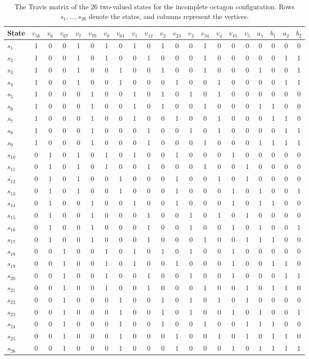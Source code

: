 \documentclass[
  twocolumn,
  aps,
  pra,
  floatfix,
  amsmath,amssymb,
  longbibliography
]{revtex4-2}
\theoremstyle{definition}
\theoremstyle{remark}
\begin{document}
\begin{table}[htb]
\centering
\caption{The Travis matrix of the 26 two-valued states for the incomplete octagon configuration. Rows $s_1, \dots, s_{26}$ denote the states, and columns represent the vertices.}
\label{tab:matrix26}
\footnotesize
\setlength{\tabcolsep}{4.5pt}
\begin{tabular}{l|cccccccccccccccccccc}
\toprule
State & $v_{56}$ & $v_{6}$ & $v_{67}$ & $v_{7}$ & $v_{70}$ & $v_{0}$ & $v_{01}$ & $v_{1}$ & $v_{12}$ & $v_{2}$ & $v_{23}$ & $v_{3}$ & $v_{34}$ & $v_{4}$ & $v_{45}$ & $v_{5}$ & $a_{1}$ & $b_{1}$ & $a_{2}$ & $b_{2}$ \\
\midrule
$s_{1}$  & 1&0&0&1&0&1&0&1&0&1&0&0&1&0&0&0&0&0&0&0 \\
$s_{2}$  & 1&0&0&1&0&1&0&0&1&0&0&0&1&0&0&0&0&0&1&1 \\
$s_{3}$  & 1&0&0&1&0&0&1&0&0&1&0&0&1&0&0&0&1&0&0&1 \\
$s_{4}$  & 1&0&0&1&0&0&1&0&0&0&1&0&0&1&0&0&0&0&1&1 \\
$s_{5}$  & 1&0&0&0&1&0&0&1&0&1&0&1&0&1&0&0&0&0&0&0 \\
$s_{6}$  & 1&0&0&0&1&0&0&1&0&1&0&0&1&0&0&0&1&1&0&0 \\
$s_{7}$  & 1&0&0&0&1&0&0&1&0&0&1&0&0&1&0&0&0&1&1&0 \\
$s_{8}$  & 1&0&0&0&1&0&0&0&1&0&0&1&0&1&0&0&0&0&1&1 \\
$s_{9}$  & 1&0&0&0&1&0&0&0&1&0&0&0&1&0&0&0&1&1&1&1 \\
$s_{10}$ & 0&1&0&1&0&1&0&1&0&0&1&0&0&0&1&0&0&0&0&0 \\
$s_{11}$ & 0&1&0&1&0&1&0&0&1&0&0&0&1&0&0&1&0&0&0&0 \\
$s_{12}$ & 0&1&0&1&0&0&1&0&0&0&1&0&0&1&0&1&0&0&0&0 \\
$s_{13}$ & 0&1&0&1&0&0&1&0&0&0&1&0&0&0&1&0&1&0&0&1 \\
$s_{14}$ & 0&1&0&0&1&0&0&1&0&0&1&0&0&0&1&0&1&1&0&0 \\
$s_{15}$ & 0&1&0&0&1&0&0&0&1&0&0&1&0&1&0&1&0&0&0&0 \\
$s_{16}$ & 0&1&0&0&1&0&0&0&1&0&0&1&0&0&1&0&1&0&0&1 \\
$s_{17}$ & 0&1&0&0&1&0&0&0&1&0&0&0&1&0&0&1&1&1&0&0 \\
$s_{18}$ & 0&0&1&0&0&1&0&1&0&1&0&1&0&0&1&0&0&0&0&0 \\
$s_{19}$ & 0&0&1&0&0&1&0&1&0&0&1&0&0&0&1&0&0&1&1&0 \\
$s_{20}$ & 0&0&1&0&0&1&0&0&1&0&0&1&0&0&1&0&0&0&1&1 \\
$s_{21}$ & 0&0&1&0&0&1&0&0&1&0&0&0&1&0&0&1&0&1&1&0 \\
$s_{22}$ & 0&0&1&0&0&0&1&0&0&1&0&1&0&1&0&1&0&0&0&0 \\
$s_{23}$ & 0&0&1&0&0&0&1&0&0&1&0&1&0&0&1&0&1&0&0&1 \\
$s_{24}$ & 0&0&1&0&0&0&1&0&0&1&0&0&1&0&0&1&1&1&0&0 \\
$s_{25}$ & 0&0&1&0&0&0&1&0&0&0&1&0&0&1&0&1&0&1&1&0 \\
$s_{26}$ & 0&0&1&0&0&0&1&0&0&0&1&0&0&0&1&0&1&1&1&1 \\
\bottomrule
\end{tabular}
\end{table}
\end{document}
